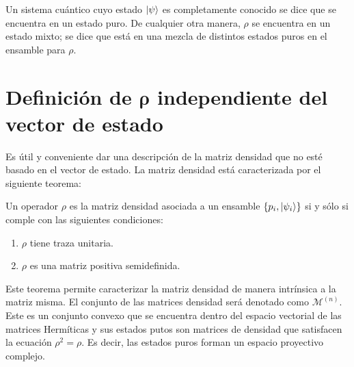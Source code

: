 \documentclass[12pt]{report}
\begin{document}
Un sistema cuántico cuyo estado $\ket{\psi}$ es completamente conocido se dice que se encuentra en
un estado puro. De cualquier otra manera, $\rho$ se encuentra en un estado mixto; se dice que está
en una mezcla de distintos estados puros en el ensamble para $\rho$. \newpage

\section{Definición de $\boldsymbol{\rho}$ independiente del vector de estado}
Es útil y conveniente dar una descripción de la matriz densidad que no esté basado en el vector de
estado. La matriz densidad está caracterizada por el siguiente teorema: 
\begin{teorema}
Un operador $\rho$ es la matriz densidad asociada a un ensamble $\{p_i, \ket{\psi _i} \}$ si y
sólo si comple con las siguientes condiciones:
\begin{enumerate}
\item $\rho$ tiene traza unitaria.
\item $\rho$ es una matriz positiva semidefinida. 
\end{enumerate}	
\end{teorema}

Este teorema permite caracterizar la matriz densidad de manera intrínsica a la matriz misma. El 
conjunto de las matrices densidad será denotado como $\mathcal{M}^{(n)}$. Este es un conjunto convexo
que se encuentra dentro del espacio vectorial de las matrices Hermíticas y sus estados putos son 
matrices de densidad que satisfacen la ecuación $\rho^2=\rho$. Es decir, las estados puros forman 
un espacio proyectivo complejo. 
\end{document}
